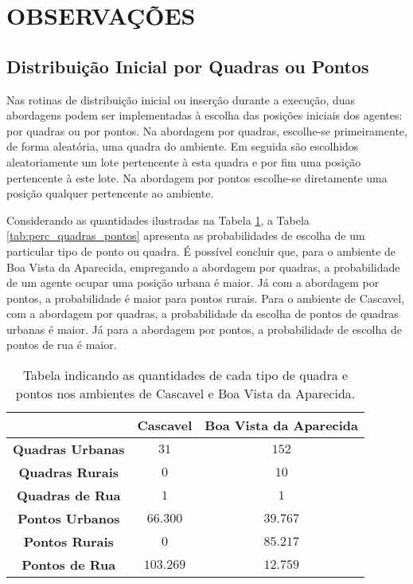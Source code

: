 \section{OBSERVAÇÕES}
\label{sec:observacoes}

\subsection{Distribuição Inicial por Quadras ou Pontos}

Nas rotinas de distribuição inicial ou inserção durante a execução, duas abordagens podem ser implementadas à escolha das posições iniciais dos agentes: por quadras ou por pontos. Na abordagem por quadras, escolhe-se primeiramente, de forma aleatória, uma quadra do ambiente. Em seguida são escolhidos aleatoriamente um lote pertencente à esta quadra e por fim uma posição pertencente à este lote. Na abordagem por pontos escolhe-se diretamente uma posição qualquer pertencente ao ambiente. 

Considerando as quantidades ilustradas na Tabela \ref{tab:quant_quadras_pontos}, a Tabela \ref{tab:perc_quadras_pontos} apresenta as probabilidades de escolha de um particular tipo de ponto ou quadra. É possível concluir que, para o ambiente de Boa Vista da Aparecida, empregando a abordagem por quadras, a probabilidade de um agente ocupar uma posição urbana é maior. Já com a abordagem por pontos, a probabilidade é maior para pontos rurais. Para o ambiente de Cascavel, com a abordagem por quadras, a probabilidade da escolha de pontos de quadras urbanas é maior. Já para a abordagem por pontos, a probabilidade de escolha de pontos de rua é maior. 

\begin{table}[H]
\centering
\begin{tabular}{c|c|c}
				& \textbf{Cascavel}		& \textbf{Boa Vista da Aparecida} 	\\ \hline
 \textbf{Quadras Urbanas}	& $31$				& $152$	  				\\
 \textbf{Quadras Rurais} 	& $0$				& $10$	  				\\
 \textbf{Quadras de Rua}	& $1$				& $1$	  				\\ \hline
 \textbf{Pontos Urbanos}	& $66.300$			& $39.767$	  			\\ 
 \textbf{Pontos Rurais}		& $0$				& $85.217$  				\\
 \textbf{Pontos de Rua}		& $103.269$			& $12.759$  				\\
 \end{tabular}
\caption{Tabela indicando as quantidades de cada tipo de quadra e pontos nos ambientes de Cascavel e Boa Vista da Aparecida. }
\label{tab:quant_quadras_pontos}
\end{table}

